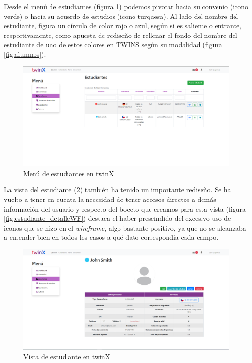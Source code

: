 Desde el menú de estudiantes (figura \ref{fig:menuestudiantestwinX}) podemos pivotar hacia su convenio (icono verde) o hacia su acuerdo de estudios (icono turquesa). Al lado del nombre del estudiante, figura un círculo de color rojo o azul, según si es saliente o entrante, respectivamente, como apuesta de rediseño de rellenar el fondo del nombre del estudiante de uno de estos colores en TWINS según su modalidad (figura \ref{fig:alumnos}).

\begin{figure}
	\centering
	\includegraphics[width=\linewidth]{img/Capturas de twinX/menu_estudiante}
	\caption{Menú de estudiantes en twinX}
	\label{fig:menuestudiantestwinX}
\end{figure}

La vista del estudiante (\ref{fig:vistaestudiantetwinX}) también ha tenido un importante rediseño. Se ha vuelto a tener en cuenta la necesidad de tener accesos directos a demás información del usuario y respecto del boceto que creamos para esta vista (figura \ref{fig:estudiante_detalleWF}) destaca el haber prescindido del  excesivo uso de iconos que se hizo en el \textit{wireframe}, algo bastante positivo, ya que no se alcanzaba a entender bien en todos los casos a qué dato correspondía cada campo.

\begin{figure}
	\centering
	\includegraphics[width=\linewidth]{img/Capturas de twinX/vista_estudiante}
	\caption{Vista de estudiante en twinX}
	\label{fig:vistaestudiantetwinX}
\end{figure}

